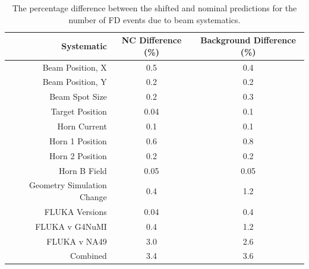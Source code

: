 \begin{table}[htb]
  \begin{center}
    \caption[Beam Systematic Errors]{The percentage difference between the shifted and nominal predictions for the number of FD events due to beam systematics.}
    \label{tab:SystBeam}
    \begin{tabular}{r c c}
      \hline\hline
      Systematic & NC Difference (\%) & Background Difference (\%) \\
      \hline
      Beam Position, X & 0.5 & 0.4 \\
      Beam Position, Y & 0.2 & 0.2 \\
      Beam Spot Size & 0.2 & 0.3 \\
      Target Position & 0.04 & 0.1 \\
      Horn Current & 0.1 & 0.1 \\
      Horn 1 Position & 0.6 & 0.8 \\
      Horn 2 Position & 0.2 & 0.2 \\
      Horn B Field & 0.05 & 0.05 \\
      Geometry Simulation Change & 0.4 & 1.2 \\
      FLUKA Versions & 0.04 & 0.4 \\
      FLUKA v G4NuMI & 0.4 & 1.2 \\
      FLUKA v NA49 & 3.0 & 2.6 \\
      \hline
      Combined & 3.4 & 3.6 \\
      \hline
    \end{tabular}
  \end{center}
\end{table}

